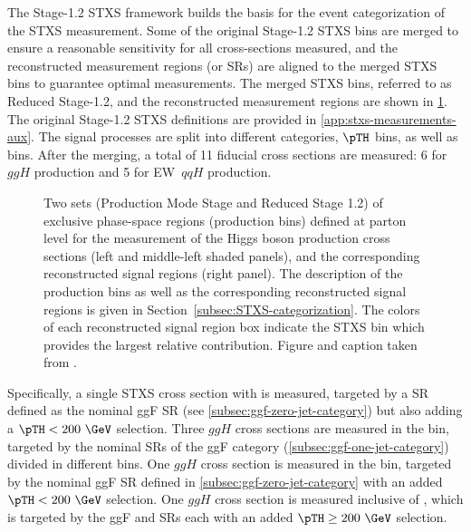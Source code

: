 The Stage-1.2 STXS framework builds the basis for the event categorization of the STXS measurement. 
Some of the original Stage-1.2 STXS bins are merged to ensure a reasonable sensitivity for all cross-sections measured, and the reconstructed measurement regions (or SRs) are aligned to the merged STXS bins to guarantee optimal measurements. 
The merged STXS bins, referred to as Reduced Stage-1.2, and the reconstructed measurement regions are shown in \cref{fig:STXS_Diagram}. 
The original Stage-1.2 STXS definitions are provided in \cref{app:stxs-measurements-aux}. 
The signal processes are split into different \Njets categories, $\pTH$ bins, as well as \mjj bins. 
After the merging, a total of 11 fiducial cross sections are measured: 6 for $ggH$ production and 5 for EW~$qqH$ production.
\begin{figure}[t]
    \caption{Two sets (Production Mode Stage and Reduced Stage 1.2) of exclusive phase-space regions (production bins) defined at parton level for the measurement of the Higgs boson production cross sections (left and middle-left shaded panels), and the corresponding reconstructed signal regions (right panel).
    The description of the production bins as well as the corresponding reconstructed signal regions is given in Section~\ref{subsec:STXS-categorization}.
    The colors of each reconstructed signal region box indicate the STXS bin which provides the largest relative contribution. Figure and caption taken from .
    \label{fig:STXS_Diagram}
    }
\end{figure}
Specifically, a single STXS cross section with \ZeroJet is measured, targeted by a SR defined as the nominal ggF \ZeroJet SR (see \cref{subsec:ggf-zero-jet-category}) but also adding a $\pTH < 200~\GeV$ selection.
Three $ggH$ cross sections are measured in the \OneJet bin, targeted by the nominal SRs of the ggF \OneJet category (\cref{subsec:ggf-one-jet-category}) divided in different \pTH bins.
One $ggH$ cross section is measured in the \TwoJet bin, targeted by the nominal ggF \TwoJet SR defined in \cref{subsec:ggf-zero-jet-category} with an added $\pTH < 200~\GeV$ selection.
One $ggH$ cross section is measured inclusive of \Njets, which is targeted by the ggF \TwoJet and \OneJet SRs each with an added $\pTH \geq 200~\GeV$ selection.
